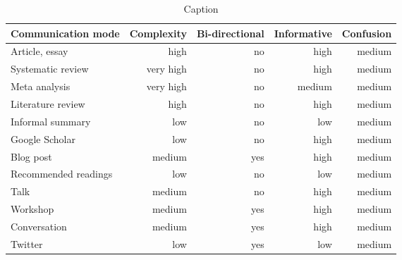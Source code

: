 \begin{table*}\centering
{}
\begin{tabular}{@{}lrrrr@{}}\toprule
Communication mode & Complexity & Bi-directional & Informative  & Confusion
\\\midrule
Article, essay      & high      & no    & high & medium  \\
Systematic review   & very high & no    & high & medium\\
Meta analysis       & very high & no    & medium & medium\\
Literature review   & high      & no    & high & medium\\
Informal summary    & low       & no    & low & medium\\
Google Scholar      & low       & no    & high & medium\\
Blog post           & medium    & yes   & high & medium\\
Recommended readings& low       & no    & low & medium\\
Talk                & medium    & no    & high & medium\\
Workshop            & medium    & yes   & high & medium\\
Conversation        & medium    & yes   & high & medium\\
Twitter             & low       & yes   & low & medium\\
\bottomrule
\end{tabular}
\caption{Caption}
\end{table*}